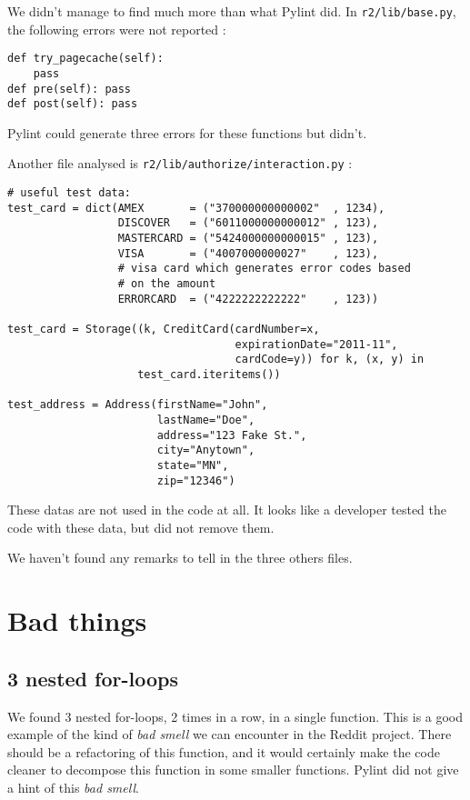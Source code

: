 \documentclass[11pt, a4paper]{article}
\newcommand{\tit}[1]{\textit{#1}}
\newcommand{\pyl}{\textsf{Pylint}}
\begin{document}
We didn't manage to find much more than what Pylint did.
In \texttt{r2/lib/base.py}, the following errors were not reported :

\begin{lstlisting}[caption= 3 useless functions]
def try_pagecache(self):
    pass
def pre(self): pass
def post(self): pass
\end{lstlisting}

\medskip
\pyl{} could generate three errors for these functions but didn't.


Another file analysed is \texttt{r2/lib/authorize/interaction.py} :

\begin{lstlisting}[caption= test data in the file..]
# useful test data:
test_card = dict(AMEX       = ("370000000000002"  , 1234),
                 DISCOVER   = ("6011000000000012" , 123),
                 MASTERCARD = ("5424000000000015" , 123),
                 VISA       = ("4007000000027"    , 123),
                 # visa card which generates error codes based
                 # on the amount
                 ERRORCARD  = ("4222222222222"    , 123))

test_card = Storage((k, CreditCard(cardNumber=x,
                                   expirationDate="2011-11",
                                   cardCode=y)) for k, (x, y) in
                    test_card.iteritems())

test_address = Address(firstName="John",
                       lastName="Doe",
                       address="123 Fake St.",
                       city="Anytown",
                       state="MN",
                       zip="12346")
\end{lstlisting}

These datas are not used in the code at all.
It looks like a developer tested the code with these data, but did not remove them.

We haven't found any remarks to tell in the three others files.


\section{Bad things}

\subsection{3 nested for-loops}

We found 3 nested for-loops, 2 times in a row, in a single function.
This is a good example of the kind of \tit{bad smell} we can encounter in the Reddit project.
There should be a refactoring of this function, and it would certainly make the code cleaner to decompose this function in some smaller functions.
\pyl{} did not give a hint of this \tit{bad smell}.
\end{document}
